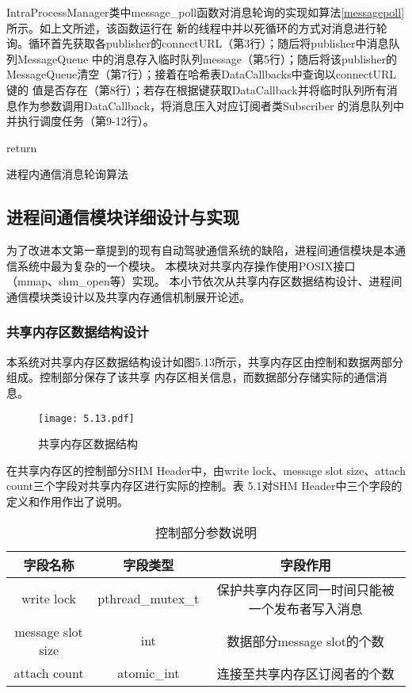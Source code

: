 IntraProcessManager类中message\_poll函数对消息轮询的实现如算法\ref{messagepoll}所示。如上文所述，该函数运行在
新的线程中并以死循环的方式对消息进行轮询。循环首先获取各publisher的connectURL（第3行）；随后将publisher中消息队列MessageQueue
中的消息存入临时队列message（第5行）；随后将该publisher的MessageQueue清空（第7行）；接着在哈希表DataCallbacks中查询以connectURL键的
值是否存在（第8行）；若存在根据键获取DataCallback并将临时队列所有消息作为参数调用DataCallback，将消息压入对应订阅者类Subscriber
的消息队列中并执行调度任务（第9-12行）。
\begin{algorithm}
  \small
  \SetAlgoLined
  return 
  \caption{进程内通信消息轮询算法}
  \label{messagepoll}
\end{algorithm}

\subsection{进程间通信模块详细设计与实现}
为了改进本文第一章提到的现有自动驾驶通信系统的缺陷，进程间通信模块是本通信系统中最为复杂的一个模块。
本模块对共享内存操作使用POSIX接口（mmap、shm\_open等）实现。
本小节依次从共享内存区数据结构设计、进程间通信模块类设计以及共享内存通信机制展开论述。

\subsubsection{共享内存区数据结构设计}
本系统对共享内存区数据结构设计如图5.13所示，共享内存区由控制和数据两部分组成。控制部分保存了该共享
内存区相关信息，而数据部分存储实际的通信消息。
\begin{figure}[H]
  \centering
  \texttt{[image: 5.13.pdf]}
  \caption{共享内存区数据结构}
  \label{fig:11}
\end{figure}

在共享内存区的控制部分SHM Header中，由write lock、message slot size、attach count三个字段对共享内存区进行实际的控制。表
5.1对SHM Header中三个字段的定义和作用作出了说明。
\begin{table}[htb]
  \centering\small
  \caption{控制部分参数说明}
  \label{tab:exampletable}
  \begin{tabular}{ccc}
    \toprule
    字段名称 & 字段类型 & 字段作用\\
    \midrule
    write lock & pthread\_mutex\_t & 保护共享内存区同一时间只能被一个发布者写入消息\\
    message slot size & int & 数据部分message slot的个数\\
    attach count & atomic\_int & 连接至共享内存区订阅者的个数\\
    \bottomrule
  \end{tabular}
\end{table}

